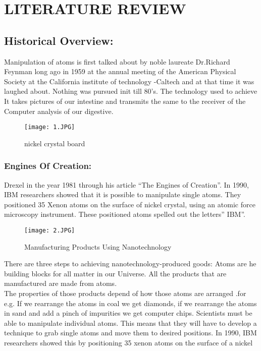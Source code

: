 \documentclass{article}
\begin{document}
\section{LITERATURE REVIEW}
\subsection{Historical Overview:}
Manipulation of atoms is first talked about by noble laureate Dr.Richard Feynman long ago in 1959 at the annual meeting of the American Physical Society at the California institute of technology -Caltech and at that time it was laughed about. Nothing was pursued init till 80’s. The technology used to achieve It takes pictures of our intestine and transmits the same to the receiver of the Computer analysis of our digestive.

\begin{figure}[h]
    \centering
    \texttt{[image: 1.JPG]}
    \caption{nickel crystal board}
\end{figure}

\subsubsection{Engines Of Creation:}
Drexel in the year 1981 through his article “The Engines of Creation”. In 1990, IBM researchers showed that it is possible to manipulate single atoms. They positioned 35 Xenon atoms on the surface of nickel crystal, using an atomic force microscopy instrument. These positioned atoms spelled out the letters” IBM”.

\begin{figure}[h]
    \centering
    \texttt{[image: 2.JPG]}
    \caption{Manufacturing Products Using Nanotechnology}
\end{figure}

There are three steps to achieving nanotechnology-produced goods: Atoms are he building blocks for all matter in our Universe. All the products that are manufactured are made from atoms.
\\The properties of those products depend of how those atoms are arranged .for e.g. If we rearrange the atoms in coal we get diamonds, if we rearrange the atoms in sand and add a pinch of impurities we get computer chips. Scientists must be able to manipulate individual atoms. This means that they will have to develop a technique to grab single atoms and move them to desired positions. In 1990, IBM researchers showed this by positioning 35 xenon atoms on the surface of a nickel
\end{document}
